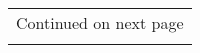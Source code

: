 \begin{longtable}[!htbp]{llll|lllll|l}
\hline
\multicolumn{10}{r}{Continued on next page} \\
\endfoot

\hline
\endlastfoot






                     

\end{longtable}

